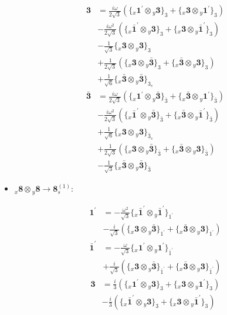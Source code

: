 \documentclass[english]{article}
\newcommand{\rep}[1]{\mathbf{#1}}
\newcommand{\repx}[2]{{}_{#2}\mathbf{#1}}
\newcommand{\tsprodx}[2]{\repx{#1}{x}\otimes\repx{#2}{y}}
\newcommand{\subcgt}[3]{\big\{ \tsprodx{#1}{#2}\big\}^{}_{#3}}
\begin{document}
\begin{itemize}
\begin{fleqn}
\begin{align*}
\rep{3} & = \frac{i \omega }{2 \sqrt{3}}\left(\subcgt{1^{\prime}}{3}{3}+\subcgt{3}{1^{\prime}}{3}\right) \\ 
 & -\frac{i \omega ^2}{2 \sqrt{3}}\left(\subcgt{\bar{1}^{\prime}}{3}{3}+\subcgt{3}{\bar{1}^{\prime}}{3}\right) \\ 
 & -\frac{1}{\sqrt{3}}\subcgt{3}{3}{3} \\ 
 & +\frac{1}{2 \sqrt{3}}\left(\subcgt{3}{\bar{3}}{3}+\subcgt{\bar{3}}{3}{3}\right) \\ 
 & +\frac{1}{\sqrt{6}}\subcgt{\bar{3}}{\bar{3}}{3_{s}}
\end{align*}
\begin{align*}
\rep{\bar{3}} & = \frac{i \omega }{2 \sqrt{3}}\left(\subcgt{1^{\prime}}{\bar{3}}{\bar{3}}+\subcgt{\bar{3}}{1^{\prime}}{\bar{3}}\right) \\ 
 & -\frac{i \omega ^2}{2 \sqrt{3}}\left(\subcgt{\bar{1}^{\prime}}{\bar{3}}{\bar{3}}+\subcgt{\bar{3}}{\bar{1}^{\prime}}{\bar{3}}\right) \\ 
 & +\frac{1}{\sqrt{6}}\subcgt{3}{3}{\bar{3}_{s}} \\ 
 & +\frac{1}{2 \sqrt{3}}\left(\subcgt{3}{\bar{3}}{\bar{3}}+\subcgt{\bar{3}}{3}{\bar{3}}\right) \\ 
 & -\frac{1}{\sqrt{3}}\subcgt{\bar{3}}{\bar{3}}{\bar{3}}
\end{align*}
\end{fleqn}
\item $\tsprodx{8}{8}\to\rep{8}_{s}^{(1)}$:
\begin{fleqn}
\begin{align*}
\rep{1^{\prime}} & = -\frac{\omega ^2}{\sqrt{3}}\subcgt{\bar{1}^{\prime}}{\bar{1}^{\prime}}{1^{\prime}} \\ 
 & -\frac{i}{\sqrt{3}}\left(\subcgt{3}{\bar{3}}{1^{\prime}}+\subcgt{\bar{3}}{3}{1^{\prime}}\right)
\end{align*}
\begin{align*}
\rep{\bar{1}^{\prime}} & = -\frac{\omega }{\sqrt{3}}\subcgt{1^{\prime}}{1^{\prime}}{\bar{1}^{\prime}} \\ 
 & +\frac{i}{\sqrt{3}}\left(\subcgt{3}{\bar{3}}{\bar{1}^{\prime}}+\subcgt{\bar{3}}{3}{\bar{1}^{\prime}}\right)
\end{align*}
\begin{align*}
\rep{3} & = \frac{i}{3}\left(\subcgt{1^{\prime}}{3}{3}+\subcgt{3}{1^{\prime}}{3}\right) \\ 
 & -\frac{i}{3}\left(\subcgt{\bar{1}^{\prime}}{3}{3}+\subcgt{3}{\bar{1}^{\prime}}{3}\right) \\ 

\end{align*}
\end{fleqn}
\end{itemize}
\end{document}
